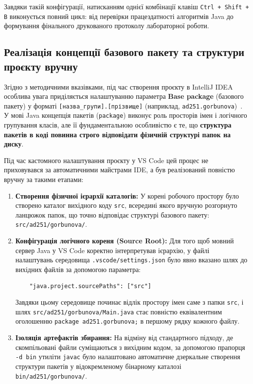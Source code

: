 Завдяки такій конфігурації, натисканням однієї комбінації клавіш \texttt{Ctrl + Shift + B} виконується повний цикл: 
від перевірки працездатності алгоритмів Java до формування фінального друкованого протоколу лабораторної роботи.

\subsection{Реалізація концепції базового пакету та структури проєкту вручну}

Згідно з методичними вказівками, під час створення проєкту в IntelliJ IDEA особлива увага приділяється налаштуванню 
параметра \textbf{Base package} (базового пакету) у форматі \texttt{[назва\_групи].[прізвище]} (наприклад, \texttt{ad251.gorbunova})~\cite{1}. 
У мові Java концепція пакетів (\texttt{package}) виконує роль просторів імен і логічного групування класів, але її 
фундаментальною особливістю є те, що \textbf{структура пакетів в коді повинна строго відповідати фізичній структурі папок на диску}.

Під час кастомного налаштування проєкту у VS Code цей процес не приховувався за автоматичними майстрами IDE, 
а був реалізований повністю вручну за такими етапами:

\begin{enumerate}
    \item \textbf{Створення фізичної ієрархії каталогів:} 
    У корені робочого простору було створено каталог вихідного коду \texttt{src}, всередині якого вручную розгорнуто 
    ланцюжок папок, що точно відповідає структурі базового пакету: \texttt{src/ad251/gorbunova/}.
    \item \textbf{Конфігурація логічного кореня (Source Root):} 
    Для того щоб мовний сервер Java у VS Code коректно інтерпретував ієрархію, у файлі налаштувань 
    середовища \texttt{.vscode/settings.json} було явно вказано шлях до вихідних файлів за допомогою параметра:
    \begin{verbatim}
    "java.project.sourcePaths": ["src"]
    \end{verbatim}
    Завдяки цьому середовище починає відлік простору імен саме з папки \texttt{src}, 
    і шлях \texttt{src/ad251/gorbunova/Main.java} стає повністю еквівалентним 
    оголошенню \texttt{package ad251.gorbunova;} в першому рядку кожного файлу.
    \item \textbf{Ізоляція артефактів збирання:} 
    На відміну від стандартного підходу, де скомпільовані файли суміщаються з вихідним кодом, за допомогою 
    прапорця \texttt{-d bin} утиліти \texttt{javac} було налаштовано автоматичне дзеркальне створення структури 
    пакетів у відокремленому бінарному каталозі \texttt{bin/ad251/gorbunova/}.
\end{enumerate}

